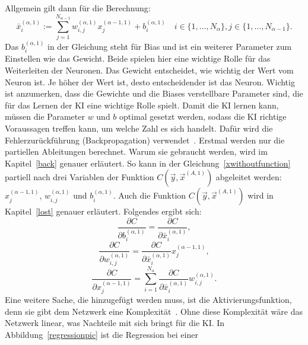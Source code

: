 \documentclass[11pt]{article}
\begin{document}
Allgemein gilt dann für die Berechnung:
\begin{equation}
    \label{xwithoutfunction}
    \bar{x}_{i}^{(\alpha,1)} := \sum_{j=1}^{N_{\alpha-1}} w_{i,j}^{(\alpha,1)} x_{j}^{(\alpha-1,1)} + b_{i}^{(\alpha,1)} \quad i \in \{1,\ldots,N_{\alpha}\}, j \in \{1,\ldots,N_{\alpha-1}\}. %
\end{equation}
Das $ b_{i}^{(\alpha,1)} $ in der Gleichung steht für Bias und ist ein weiterer Parameter zum Einstellen wie das Gewicht. Beide spielen hier eine wichtige Rolle
für das Weiterleiten der Neuronen. Das Gewicht entscheidet, wie wichtig der Wert vom Neuron ist. Je höher der Wert ist, desto entscheidender
ist das Neuron. Wichtig ist anzumerken, dass die Gewichte und die Biases verstellbare Parameter sind, die für das Lernen der KI eine wichtige Rolle
spielt. Damit die KI lernen kann, müssen die Parameter $w$ und $b$ optimal gesetzt werden, sodass die KI richtige Voraussagen treffen kann, um welche Zahl es sich handelt.
Dafür wird die Fehlerzurückführung (Backpropagation) verwendet~\cite{5}. Erstmal werden nur die partiellen Ableitungen berechnet. Warum sie gebraucht werden, wird im Kapitel~\ref{back} genauer
erläutert. So kann in der Gleichung~\ref{xwithoutfunction} partiell nach drei Variablen der Funktion $C(\vec{y},\vec{x}^{(A,1)})$ abgeleitet werden: $x_{j}^{(\alpha-1,1)}$, $w_{i,j}^{(\alpha,1)}$ und $b_{i}^{(\alpha,1)}$.
Auch die Funktion $C(\vec{y},\vec{x}^{(A,1)})$ wird in Kapitel~\ref{lost} genauer erläutert.
Folgendes ergibt sich:
\begin{equation}
    \frac{\partial C}{\partial b_i^{(\alpha,1)}} = \frac{\partial C}{\partial \bar{x}_i^{(\alpha,1)}},
\end{equation}
\begin{equation}
    \frac{\partial C}{\partial w_{i,j}^{(\alpha,1)}} = \frac{\partial C}{\partial \bar{x}_i^{(\alpha,1)}} x_j^{(\alpha-1,1)},
    \label{w}
\end{equation}
\begin{equation}
    \frac{\partial C}{\partial x_{j}^{(\alpha-1,1)}} = \sum_{i=1}^{N_{\alpha}} \frac{\partial C}{\partial \bar{x}_i^{(\alpha,1)}} w_{i,j}^{(\alpha,1)}.
\end{equation}
Eine weitere Sache, die hinzugefügt werden muss, ist die Aktivierungsfunktion, denn sie gibt dem Netzwerk eine Komplexität~\cite{7}.
Ohne diese Komplexität wäre das Netzwerk linear, was Nachteile mit sich bringt für die KI. %
In Abbildung~\ref{regressionpic} ist die Regression bei einer
\end{document}
